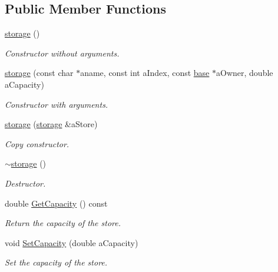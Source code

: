 \subsection*{Public Member Functions}
\begin{DoxyCompactItemize}
\item 
\hyperlink{classstorage_a55f5297949ab4ab66c09563e1d3875ec}{storage} ()
\begin{DoxyCompactList}\small\item\em Constructor without arguments. \item\end{DoxyCompactList}\item 
\hyperlink{classstorage_a6d6ff9d76ac1bb57c7977c56d5e8b61f}{storage} (const char $\ast$aname, const int aIndex, const \hyperlink{classbase}{base} $\ast$aOwner, double aCapacity)
\begin{DoxyCompactList}\small\item\em Constructor with arguments. \item\end{DoxyCompactList}\item 
\hyperlink{classstorage_adeb4f7de2055ed2a3384d6440df43c49}{storage} (\hyperlink{classstorage}{storage} \&aStore)
\begin{DoxyCompactList}\small\item\em Copy constructor. \item\end{DoxyCompactList}\item 
\hyperlink{classstorage_ac7d5664e97625603e30f649d45231b06}{$\sim$storage} ()
\begin{DoxyCompactList}\small\item\em Destructor. \item\end{DoxyCompactList}\item 
double \hyperlink{classstorage_ac6d321e217929cd9906adee777822dea}{GetCapacity} () const 
\begin{DoxyCompactList}\small\item\em Return the capacity of the store. \item\end{DoxyCompactList}\item 
void \hyperlink{classstorage_ac943ca0d285591334ab8808d703aa106}{SetCapacity} (double aCapacity)
\begin{DoxyCompactList}\small\item\em Set the capacity of the store. \item\end{DoxyCompactList}\item 

\end{DoxyCompactItemize}
